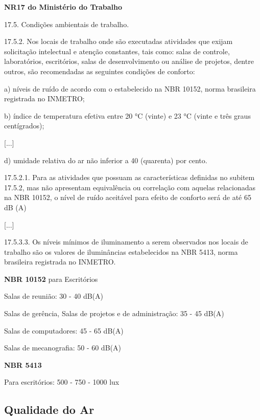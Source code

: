 \documentclass[../monografia.tex]{subfiles}
\begin{document}
\begin{citacaoLonga} %
\textbf{NR17 do Ministério do Trabalho} \cite{NR17}

17.5. Condições ambientais de trabalho.

17.5.2. Nos locais de trabalho onde são executadas atividades que exijam solicitação intelectual e atenção constantes, tais como: salas de controle, laboratórios, escritórios, salas de desenvolvimento ou análise de projetos, dentre outros, são recomendadas as seguintes condições de conforto:

a) níveis de ruído de acordo com o estabelecido na NBR 10152, norma brasileira registrada no INMETRO;

b) índice de temperatura efetiva entre 20 °C (vinte) e 23 °C (vinte e três graus centígrados);

[...]

d) umidade relativa do ar não inferior a 40 (quarenta) por cento.

17.5.2.1. Para as atividades que possuam as características definidas no subitem 17.5.2, mas não apresentam equivalência ou correlação com aquelas relacionadas na NBR 10152, o nível de ruído aceitável para efeito de conforto será de até 65 dB (A)

[...]

17.5.3.3. Os níveis mínimos de iluminamento a serem observados nos locais de trabalho são os valores de iluminâncias estabelecidos na NBR 5413, norma brasileira registrada no INMETRO.
\end{citacaoLonga}

\begin{citacaoLonga} %

\textbf{NBR 10152} \cite{NBR10152} para Escritórios

Salas de reunião: 30 - 40 dB(A)

Salas de gerência, Salas de projetos e de administração: 35 - 45 dB(A)

Salas de computadores: 45 - 65 dB(A)

Salas de mecanografia: 50 - 60 dB(A)

\textbf{NBR 5413} \cite{NBR5413}

Para escritórios: 500 - 750 - 1000 lux
\end{citacaoLonga}

\subsection{Qualidade do Ar} %
\end{document}
